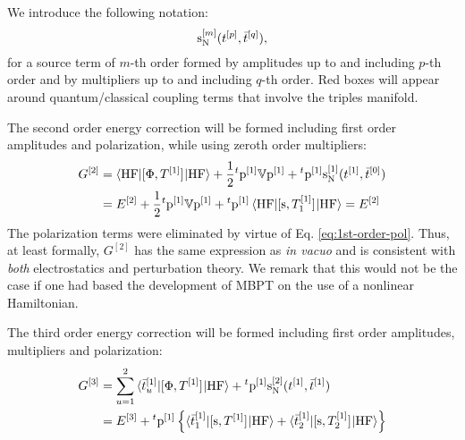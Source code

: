 We introduce the following notation:
\begin{equation}
  \mathrm{s}_{\mathrm{N}}^{[m]}(t_{}^{[p]}, \bar{t}_{}^{[q]}),
\end{equation}
for a source term of $m$-th order formed by amplitudes up to and
including $p$-th order and by multipliers up to and including $q$-th order.
Red boxes will appear around quantum/classical coupling terms that
involve the triples manifold.

The second order energy correction will be formed including first order
amplitudes and polarization, while using zeroth order multipliers:
\begin{equation}\label{eq:pted-mbpt-2nd}
  \begin{aligned}
  G^{[2]} &=
  \braket{\mathrm{HF} | [ \Phi, T^{[1]} ]^{} | \mathrm{HF}}
  + \frac{1}{2}{}^t\mathrm{p}^{[1]}\mathbb{V}\mathrm{p}^{[1]} +
  {}^t\mathrm{p}^{[1]}\mathrm{s}_{\mathrm{N}}^{[1]}(t_{}^{[1]}, \bar{t}_{}^{[0]}) \\
  &= E^{[2]}
  +
  \frac{1}{2}{}^t\mathrm{p}^{[1]}\mathbb{V}\mathrm{p}^{[1]}
  +
  {}^t\mathrm{p}^{[1]}\braket{\mathrm{HF} | [ \mathrm{s}, T^{[1]}_1 ]^{} | \mathrm{HF}}
  = E^{[2]}
  \end{aligned}
\end{equation}
The polarization terms were eliminated by virtue of Eq.
\eqref{eq:1st-order-pol}. Thus, at least formally, $G^{[2]}$ has the same expression as
\emph{in vacuo} and is consistent with \emph{both} electrostatics and
perturbation theory.
We remark that this would not be the case if one had based the
development of \acrshort{MBPT} on the use of a nonlinear
Hamiltonian.\autocite{Angyan1995-co}

The third order energy correction will be formed including first order
amplitudes, multipliers and polarization:
\begin{equation}\label{eq:pted-mbpt-3rd}
  \begin{aligned}
    G^{[3]} &=
    \sum_{u=1}^2\braket{\bar{t}_{u}^{[1]} | [ \Phi, T^{[1]} ]^{} | \mathrm{HF}}
    + {}^t\mathrm{p}^{[1]}\mathrm{s}_{\mathrm{N}}^{[2]}(t_{}^{[1]}, \bar{t}_{}^{[1]}) \\
    &=
    E^{[3]}
    + {}^t\mathrm{p}^{[1]}
    \left\lbrace
      \braket{\bar{t}_{1}^{[1]} | [ \mathrm{s}, T^{[1]} ]^{} | \mathrm{HF}}
    + \braket{\bar{t}_{2}^{[1]} | [ \mathrm{s}, T^{[1]}_2 ]^{} | \mathrm{HF}}
    \right\rbrace
  \end{aligned}
\end{equation}

